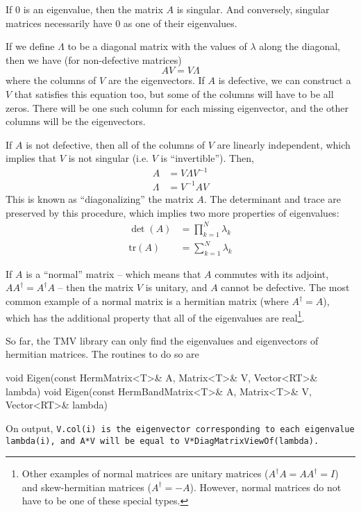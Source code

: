 If $0$ is an eigenvalue, then the matrix $A$ is singular.
And conversely, singular matrices necessarily have $0$ as one of their eigenvalues.

If we define $\Lambda$ to be a diagonal matrix with the values of $\lambda$ along
the diagonal, then we have (for non-defective matrices)
\begin{equation*}
A V = V \Lambda
\end{equation*}
where the columns of $V$ are the eigenvectors.  If $A$ is defective, we can construct
a $V$ that satisfies this equation too, but some of the columns will have to be all zeros.
There will be one such column for each missing eigenvector, and the other columns will
be the eigenvectors.

If $A$ is not defective, then all of the columns of $V$ are linearly independent, which
implies that $V$ is not singular (i.e. $V$ is ``invertible'').  Then,
\begin{align*}
A &= V \Lambda V^{-1}\\
\Lambda &= V^{-1} A V
\end{align*}
This is known as ``diagonalizing'' the matrix $A$.  The determinant and trace are preserved by this procedure, which implies two more properties of eigenvalues:
\begin{align*}
\det(A) &= \prod_{k=1}^{N} \lambda_k\\
\text{tr}(A) &= \sum_{k=1}^{N} \lambda_k
\end{align*}

If $A$ is a ``normal'' matrix -- which means that $A$ commutes with its adjoint,
$AA^\dagger = A^\dagger A$ -- then the 
matrix $V$ is unitary, and $A$ cannot be defective.  
The most common example of a normal matrix is a hermitian matrix
(where $A^\dagger = A$), which has
the additional property that all of the eigenvalues are real\footnote{
Other examples of normal matrices are unitary matrices ($A^\dagger A = AA^\dagger = I$)
and skew-hermitian matrices ($A^\dagger = -A$).  However, normal matrices do
not have to be one of these special types.}.

So far, the TMV library can only find the eigenvalues and eigenvectors 
of hermitian matrices.  The routines to do so are 
\begin{tmvcode}
void Eigen(const HermMatrix<T>& A, Matrix<T>& V, Vector<RT>& lambda)
void Eigen(const HermBandMatrix<T>& A, Matrix<T>& V, Vector<RT>& lambda)
\end{tmvcode}
On output, \tt{V.col(i)} is the eigenvector corresponding to each eigenvalue \tt{lambda(i)},
and \tt{A*V} will be equal to \tt{V*DiagMatrixViewOf(lambda)}.

